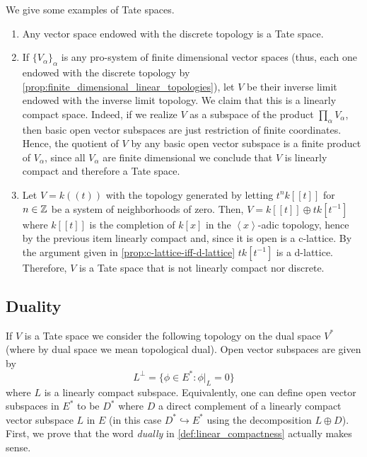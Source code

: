 \begin{example}\label{ex:tate-spaces}
We give some examples of Tate spaces.
\begin{enumerate}[label = (\alph*)]
	\item Any vector space endowed with the discrete topology is a Tate space.
	\item If $\{V_{\alpha}\}_{\alpha}$ is any pro-system of finite dimensional vector spaces (thus, each one endowed with the discrete topology by \cref{prop:finite_dimensional_linear_topologies}), let $V$ be their inverse limit endowed with the inverse limit topology. We claim that this is a linearly compact space. Indeed, if we realize $V$ as a subspace of the product $\prod_{\alpha} V_{\alpha}$, then basic open vector subspaces are just restriction of finite coordinates. Hence, the quotient of $V$ by any basic open vector subspace is a finite product of $V_{\alpha}$, since all $V_{\alpha}$ are finite dimensional we conclude that $V$ is linearly compact and therefore a Tate space.
	\item Let $V = k\left((t)\right)$ with the topology generated by letting $t^{n}k\left[[t]\right]$ for $n \in {\mathbb Z}$ be a system of neighborhoods of zero. Then, $V = k\left[[t]\right] \oplus t k[t^{-1}]$ where $k\left[[t]\right]$ is the completion of $k[x]$ in the $\left\langle x\right\rangle$-adic topology, hence by the previous item linearly compact and, since it is open is a c-lattice. By the argument given in \cref{prop:c-lattice-iff-d-lattice} $t k[t^{-1}]$ is a d-lattice. Therefore, $V$ is a Tate space that is not linearly compact nor discrete.
	
	\end{enumerate}

\end{example}
\subsection*{Duality}
If $V$ is a Tate space we consider the following topology on the dual space $V^{*}$ (where by dual space we mean topological dual). Open vector subspaces are given by
\[
	L^{\perp} = \{\phi\in E^{*} \colon \phi\lvert_{L} = 0\}
\]
where $L$ is a linearly compact subspace. Equivalently, one can define open vector subspaces in $E^{*}$ to be $D^{*}$ where $D$ a direct complement of a linearly compact vector subspace $L$ in $E$ (in this case $D^{*} \hookrightarrow E^{*}$ using the decomposition $L\oplus D$).  \\
First, we prove that the word \emph{dually} in \cref{def:linear_compactness} actually makes sense. 

